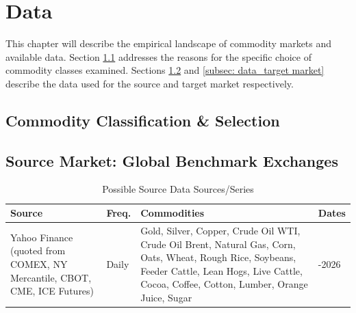 
\section{Data} \label{sec: data}
This chapter will describe the empirical landscape of commodity markets and available data. Section \ref{subsec: data_commodity classification and selection} addresses the reasons for the specific choice of commodity classes examined. Sections \ref{subsec: data_source market} and \ref{subsec: data_target market} describe the data used for the source and target market respectively. 

\subsection{Commodity Classification \& Selection} \label{subsec: data_commodity classification and selection}
\subsection{Source Market: Global Benchmark Exchanges} \label{subsec: data_source market}

\vspace{-10pt}
\begin{table}[h!]
\caption{Possible Source Data Sources/Series}
\label{tab:target-data-sources}
\footnotesize

\begin{tabularx}{\textwidth}{
    @{}
    >{\raggedright\arraybackslash}p{}
    >{\raggedright\arraybackslash}p{}
    >{\raggedright\arraybackslash}X
    >{\raggedright\arraybackslash}p{}
    @{}
}
\toprule
\textbf{Source} &
\textbf{Freq.} &
\textbf{Commodities} &
\textbf{Dates} \\
\midrule
Yahoo Finance (quoted from COMEX, NY Mercantile, CBOT, CME, ICE Futures) &
Daily &
Gold, Silver, Copper, Crude Oil WTI, Crude Oil Brent, Natural Gas, Corn, Oats, Wheat, Rough Rice, Soybeans, Feeder Cattle, Lean Hogs, Live Cattle, Cocoa, Coffee, Cotton, Lumber, Orange Juice, Sugar &
1999-2026 \\
\bottomrule
\end{tabularx}
\end{table}



